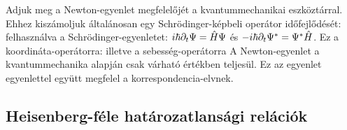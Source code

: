    Adjuk meg a Newton-egyenlet megfelelőjét a kvantummechanikai eszköztárral. Ehhez kiszámoljuk általánosan egy Schrödinger-képbeli operátor időfejlődését:
   felhasználva a Schrödinger-egyenletet: $i\hbar\partial_t\Psi=\hat{H}\Psi$ és $-i\hbar\partial_t\Psi^*=\Psi^*\hat{H}$.
   Ez a koordináta-operátorra:
   illetve a sebesség-operátorra
   A Newton-egyenlet a kvantummechanika alapján csak várható értékben teljesül. Ez az egyenlet  egyenlettel együtt megfelel a korrespondencia-elvnek. 
   
  \subsection{Heisenberg-féle határozatlansági relációk}
   
